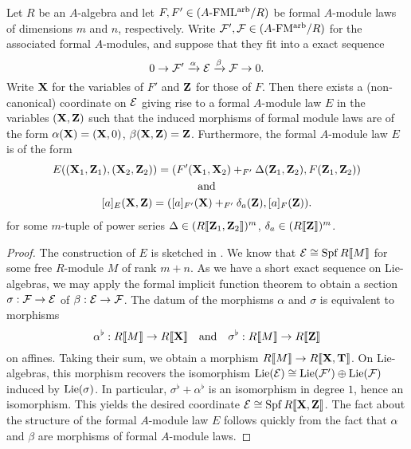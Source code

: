 \documentclass[../main.tex]{subfiles}
\begin{document}
\begin{lem}%
  Let $R$ be an $A$-algebra and let $F, F' \in {({A}\textnormal-\allowbreak\mathrm{FML^{arb}}/{R})}$ be 
  formal $A$-module laws of dimensions $m$ and $n$, respectively. Write 
  $\mathcal{F}', \mathcal{F} \in {({A}\textnormal-\allowbreak\mathrm{FM^{arb}}/{R})}$ for the associated formal $A$-modules,
  and suppose that they fit into a exact sequence
  \begin{equation*}
    0 \to \mathcal{F}' \xrightarrow{\alpha} \mathcal{E} \xrightarrow{\beta} \mathcal{F} \to 0.
  \end{equation*}
  Write $\mathbf{X}$ for the variables of $F'$ and $\mathbf{Z}$ for those of $F$. Then 
  there exists a (non-canonical) coordinate on $\mathcal{E}$ giving rise to a formal
  $A$-module law $E$ in the variables $(\mathbf{X}, \mathbf{Z})$ such that the induced morphisms
  of formal module laws are of the form 
  $\alpha(\mathbf{X}) = (\mathbf{X}, 0)$, $\beta(\mathbf{X}, \mathbf{Z}) = \mathbf{Z}$. Furthermore, 
  the formal $A$-module law $E$ is of the form
  \begin{equation}%
  \begin{gathered}
    E((\bX_1, \bZ_1), (\bX_2, \bZ_2)) = (F'(\bX_1, \bX_2) +_{F'} \Delta(\bZ_1,
    \bZ_2) , F(\bZ_1, \bZ_2)) \\
    \text{and} \\
    [a]_E(\bX, \bZ) = ([a]_{F'}(\bX) +_{F'} \delta_a(\bZ), [a]_F(\bZ)).
  \end{gathered}
  \end{equation}
  for some $m$-tuple of power series $\Delta \in (R\llbracket \mathbf{Z}_1, \mathbf{Z}_2 \rrbracket)^m$,
  $\delta_a \in (R\llbracket \mathbf{Z} \rrbracket)^m$. 
\begin{proof}
  The construction of $E$ is sketched in \cite[Proposition
  6.5]{hopkins1994equivariant}. We know that $\mathcal{E} \cong \operatorname{Spf} R\llbracket M \rrbracket$ 
  for some free $R$-module $M$ of rank $m+n$. As we have a short 
  exact sequence on Lie-algebras, we may apply the formal implicit function
  theorem  to obtain a section 
  $\sigma: \mathcal{F} \to \mathcal{E}$ of $\beta:\mathcal{E} \to \mathcal{F}$. 
  The datum of the morphisms $\alpha$ and $\sigma$ is equivalent to 
  morphisms
  \begin{equation*}
    \alpha^\flat: R \llbracket M \rrbracket \to R \llbracket \mathbf{X} \rrbracket \quad \text{and} \quad
    \sigma^\flat: R \llbracket M \rrbracket \to R \llbracket \mathbf{Z} \rrbracket
  \end{equation*}
  on affines. Taking their sum, we obtain a morphism $R \llbracket M \rrbracket
  \to R\llbracket \mathbf{X}, \mathbf{T} \rrbracket$. On Lie-algebras, this morphism recovers the
  isomorphism $\operatorname{Lie}(\mathcal{E}) \cong \operatorname{Lie}(\mathcal{F}') \oplus \operatorname{Lie}(\mathcal{F})$ induced by 
  $\operatorname{Lie}(\sigma)$. In particular, $\sigma^\flat + \alpha^\flat$ is an isomorphism
  in degree $1$, hence an isomorphism. This yields the desired
  coordinate $\mathcal{E} \cong \operatorname{Spf} R\llbracket \mathbf{X}, \mathbf{Z}\rrbracket$. The fact about the 
  structure of the formal $A$-module law $E$ follows quickly from the fact that 
  $\alpha$ and $\beta$ are morphisms of formal $A$-module laws. 
\end{proof}
\end{lem}
\end{document}
